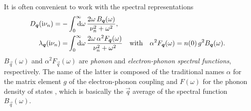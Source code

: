 It is often convenient to work with the spectral representations
%
\begin{align*}
    D_{\vec q}(\I \nu_n) = -&\int \from 0 \till \infty \D \omega \,
        \frac{2 \omega \, B_{\vec q}(\omega)}{\nu_n^2 + \omega^2},
    \\
    \lambda_{\vec q}(\I \nu_n) = &\int \from 0 \till \infty \D \omega \,
        \frac{2 \omega \, \alpha^2 F_{\vec q}(\omega)}{\nu_n^2 + \omega^2}
    \quad \text{with} \quad
    \alpha^2 F_{\vec q}(\omega) = n(0) \, g^2 B_{\vec q}(\omega).
\end{align*}
%
$B_{\vec q}(\omega)$ and $\alpha^2 F_{\vec q}(\omega)$ are \emph{phonon} and
\emph{electron-phonon spectral functions}, respectively. The name of the latter
is composed of the traditional names $\alpha$ for the matrix element $g$ of the
electron-phonon coupling \cite[Eq.~1, e.g.]{Migdal58} and $F(\omega)$ for the
phonon density of states \cite[16]{AllenMitrovic82}, which is basically the
$\vec q$ average of the spectral function $B_{\vec q}(\omega)$.

